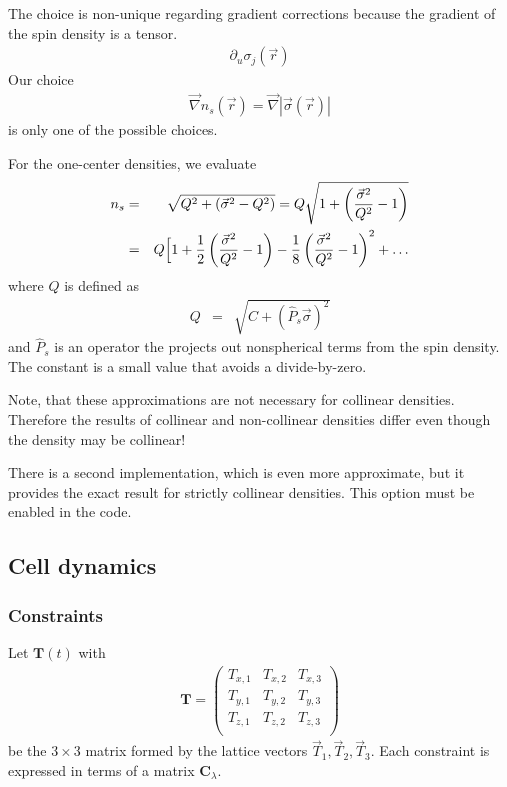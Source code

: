 \documentclass[final,12pt]{article}
\newcommand{\mat}[1]{\mathbf{#1}}
\begin{document}
{{{{{{The choice is non-unique regarding gradient corrections because the
gradient of the spin density is a tensor.
\begin{eqnarray*}
\partial_u\sigma_j(\vec{r})
\end{eqnarray*}
Our choice
\begin{eqnarray*}
\vec{\nabla}n_s(\vec{r})=\vec{\nabla}|\vec{\sigma}(\vec{r})|
\end{eqnarray*}
is only one of the possible choices. 


For the one-center densities, we evaluate
\begin{eqnarray*}
n_s&=&\sqrt{Q^2+\left(\vec{\sigma}^2-Q^2\right)}
=Q\sqrt{1+\left(\frac{\vec{\sigma}^2}{Q^2}-1\right)}
\\
&=&Q\Bigl[1+\frac{1}{2}\left(\frac{\vec{\sigma}^2}{Q^2}-1\right)
-\frac{1}{8}\left(\frac{\vec{\sigma}^2}{Q^2}-1\right)^2+\ldots
\end{eqnarray*}
where $Q$ is defined as
\begin{eqnarray*}
Q&=&\sqrt{C+(\hat{P}_s\vec{\sigma})^2}
\end{eqnarray*}
and $\hat{P}_s$ is an operator the projects out nonspherical terms
from the spin density. The constant is a small value that avoids a 
divide-by-zero.

Note, that these approximations are not necessary for collinear
densities. Therefore the results of collinear and non-collinear
densities differ even though the density may be collinear!

There is a second implementation, which is even more approximate, but
it provides the exact result for strictly collinear densities. This
option must be enabled in the code.

\subsection{Cell dynamics}
\subsubsection{Constraints}
\label{sec:unitcellconstraints}
Let $\mat{T}(t)$ with
\begin{eqnarray}
\mat{T}=\left(\begin{array}{ccc}
T_{x,1} & T_{x,2} & T_{x,3}\\
T_{y,1} & T_{y,2} & T_{y,3}\\
T_{z,1} & T_{z,2} & T_{z,3}\\
\end{array}\right)
\end{eqnarray}
be the $3\times3$ matrix formed by the lattice vectors
$\vec{T}_1,\vec{T}_2,\vec{T}_3$.  Each constraint is expressed in
terms of a matrix $\mat{C}_\lambda$. 


}}}}}}
\end{document}
